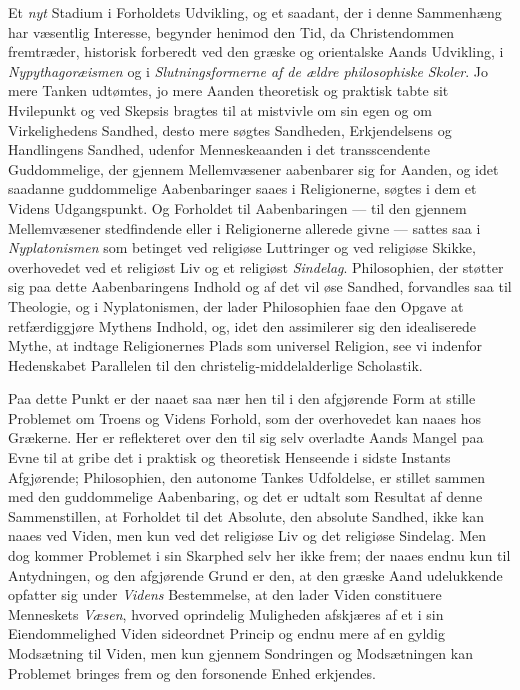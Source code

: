 \documentclass[12pt,a4paper]{book}
\newcommand{\opage}[1]{\marginnote{\footnotesize\textit{[#1]}}}
\begin{document}
Et \emph{nyt} Stadium i Forholdets Udvikling, og et saadant, der i denne
Sammenhæng har væsentlig Interesse, begynder henimod den Tid, da
Christendommen fremtræder, historisk forberedt ved den græske og
orientalske Aands Udvikling, i \emph{Nypythagoræismen} og i \emph{Slutningsformerne af de ældre philosophiske Skoler}. Jo mere Tanken udtømtes, jo mere
Aanden theoretisk og praktisk tabte sit Hvilepunkt og ved Skepsis
bragtes til at mistvivle om sin egen og om Virkelighedens Sandhed,
desto mere søgtes Sandheden, Erkjendelsens og Handlingens Sandhed,
udenfor Menneskeaanden i det transscendente Guddommelige, der gjennem
Mellemvæsener aabenbarer sig for Aanden, og idet saadanne
guddommelige Aabenbaringer saaes i Religionerne, søgtes i dem et
Videns Udgangspunkt. Og Forholdet til Aabenbaringen --- til den
gjennem Mellemvæsener stedfindende eller i Religionerne allerede givne
--- sattes saa i \emph{Nyplatonismen} som betinget ved religiøse Luttringer
og ved religiøse Skikke, overhovedet ved et religiøst Liv og et
religiøst \emph{Sindelag}. Philosophien, der støtter sig paa dette
Aabenbaringens Indhold og af det vil øse Sandhed, \opage{11}forvandles saa til
Theologie, og i Nyplatonismen, der lader Philosophien faae den Opgave
at retfærdiggjøre Mythens Indhold, og, idet den assimilerer sig den
idealiserede Mythe, at indtage Religionernes Plads som universel
Religion, see vi indenfor Hedenskabet Parallelen til den
christelig-middelalderlige Scholastik.

Paa dette Punkt er der naaet saa nær hen til i den afgjørende Form at
stille Problemet om Troens og Videns Forhold, som der overhovedet kan
naaes hos Grækerne. Her er reflekteret over den til sig selv overladte
Aands Mangel paa Evne til at gribe det i praktisk og theoretisk
Henseende i sidste Instants Afgjørende; Philosophien, den autonome
Tankes Udfoldelse, er stillet sammen med den guddommelige Aabenbaring,
og det er udtalt som Resultat af denne Sammenstillen, at Forholdet til
det Absolute, den absolute Sandhed, ikke kan naaes ved Viden, men kun
ved det religiøse Liv og det religiøse Sindelag. Men dog kommer
Problemet i sin Skarphed selv her ikke frem; der naaes endnu kun til
Antydningen, og den afgjørende Grund er den, at den græske Aand
udelukkende opfatter sig under \emph{Videns} Bestemmelse, at den lader Viden
constituere Menneskets \emph{Væsen}, hvorved oprindelig Muligheden afskjæres
af et i sin Eiendommelighed Viden sideordnet Princip og endnu mere af
en gyldig Modsætning til Viden, men kun gjennem Sondringen og
Modsætningen kan Problemet bringes frem og den forsonende Enhed
erkjendes.
\end{document}
